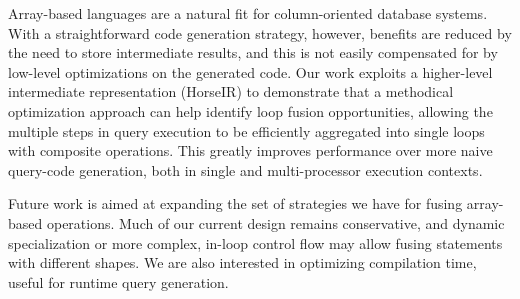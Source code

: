 Array-based languages are a natural fit for column-oriented database systems.
With a straightforward code generation strategy, however, benefits are reduced
by the need to store intermediate results, and this is not easily compensated
for by low-level optimizations on the generated code.  Our work exploits a
higher-level intermediate representation (HorseIR) to demonstrate that a
methodical optimization approach can help identify loop fusion opportunities,
allowing the multiple steps in query execution to be efficiently aggregated
into single loops with composite operations. This greatly improves performance
over more naive query-code generation, both in single and multi-processor
execution contexts.

Future work is aimed at expanding the set of strategies we have for fusing
array-based operations.  Much of our current design remains conservative, and
dynamic specialization or more complex, in-loop control flow may allow fusing
statements with different shapes.  We are also interested in optimizing
compilation time, useful for runtime query generation.
